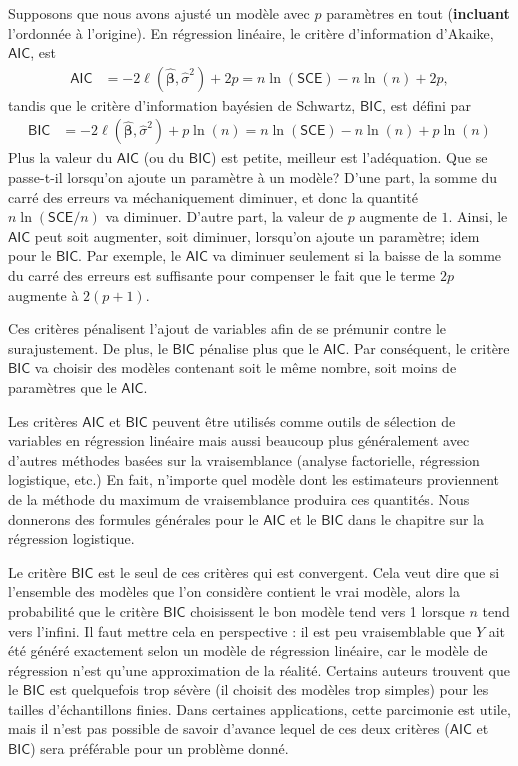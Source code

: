 \documentclass[
  11pt,
  letterpaper,
]{book}
\theoremstyle{definition}
\theoremstyle{definition}
\theoremstyle{definition}
\theoremstyle{definition}
\theoremstyle{remark}
\begin{document}
Supposons que nous avons ajusté un modèle avec \(p\) paramètres en tout (\textbf{incluant} l'ordonnée à l'origine). En régression linéaire, le critère d'information d'Akaike, \(\mathsf{AIC}\), est
\begin{align*}
\mathsf{AIC} &=-2 \ell(\widehat{\boldsymbol{\beta}}, \widehat{\sigma}^2) +2p=n \ln (\mathsf{SCE}) - n\ln(n) + 2p,
\end{align*}
tandis que le critère d'information bayésien de Schwartz, \(\mathsf{BIC}\), est défini par
\begin{align*}
\mathsf{BIC} &=-2 \ell(\widehat{\boldsymbol{\beta}}, \widehat{\sigma}^2) + p\ln(n)=n \ln (\mathsf{SCE}) - n\ln(n) + p\ln(n)
\end{align*}
Plus la valeur du \(\mathsf{AIC}\) (ou du \(\mathsf{BIC}\)) est petite, meilleur est l'adéquation. Que se passe-t-il lorsqu'on ajoute un paramètre à un modèle? D'une part, la somme du carré des erreurs va méchaniquement diminuer, et donc la quantité \(n \ln (\mathsf{SCE}/n)\) va diminuer. D'autre part, la valeur de \(p\) augmente de \(1\). Ainsi, le \(\mathsf{AIC}\) peut soit augmenter, soit diminuer, lorsqu'on ajoute un paramètre; idem pour le \(\mathsf{BIC}\). Par exemple, le \(\mathsf{AIC}\) va diminuer seulement si la baisse de la somme du carré des erreurs est suffisante pour compenser le fait que le terme \(2p\) augmente à \(2 (p+1)\).

Ces critères pénalisent l'ajout de variables afin de se prémunir contre le surajustement. De plus, le \(\mathsf{BIC}\) pénalise plus que le \(\mathsf{AIC}\). Par conséquent, le critère \(\mathsf{BIC}\) va choisir des modèles contenant soit le même nombre, soit moins de paramètres que le \(\mathsf{AIC}\).

Les critères \(\mathsf{AIC}\) et \(\mathsf{BIC}\) peuvent être utilisés comme outils de sélection de variables en régression linéaire mais aussi beaucoup plus généralement avec d'autres méthodes basées sur la vraisemblance (analyse factorielle, régression logistique, etc.) En fait, n'importe quel modèle dont les estimateurs proviennent de la méthode du maximum de vraisemblance produira ces quantités. Nous donnerons des formules générales pour le \(\mathsf{AIC}\) et le \(\mathsf{BIC}\) dans le chapitre sur la régression logistique.

Le critère \(\mathsf{BIC}\) est le seul de ces critères qui est convergent. Cela veut dire que si l'ensemble des modèles que l'on considère contient le vrai modèle, alors la probabilité que le critère \(\mathsf{BIC}\) choisissent le bon modèle tend vers 1 lorsque \(n\) tend vers l'infini. Il faut mettre cela en perspective : il est peu vraisemblable que \(Y\) ait été généré exactement selon un modèle de régression linéaire, car le modèle de régression n'est qu'une approximation de la réalité. Certains auteurs trouvent que le \(\mathsf{BIC}\) est quelquefois trop sévère (il choisit des modèles trop simples) pour les tailles d'échantillons finies. Dans certaines applications, cette parcimonie est utile, mais il n'est pas possible de savoir d'avance lequel de ces deux critères (\(\mathsf{AIC}\) et \(\mathsf{BIC}\)) sera préférable pour un problème donné.
\end{document}
